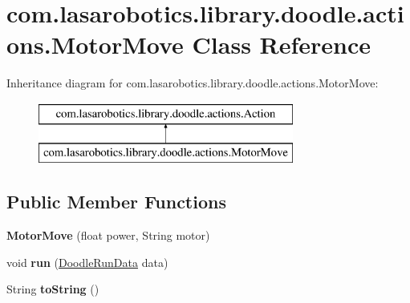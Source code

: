 \hypertarget{classcom_1_1lasarobotics_1_1library_1_1doodle_1_1actions_1_1_motor_move}{}\section{com.\+lasarobotics.\+library.\+doodle.\+actions.\+Motor\+Move Class Reference}
\label{classcom_1_1lasarobotics_1_1library_1_1doodle_1_1actions_1_1_motor_move}
Inheritance diagram for com.\+lasarobotics.\+library.\+doodle.\+actions.\+Motor\+Move\+:\begin{figure}[H]
\begin{center}
\leavevmode
\includegraphics[height=2.000000cm]{classcom_1_1lasarobotics_1_1library_1_1doodle_1_1actions_1_1_motor_move}
\end{center}
\end{figure}
\subsection*{Public Member Functions}
\begin{DoxyCompactItemize}
\item 
\hypertarget{classcom_1_1lasarobotics_1_1library_1_1doodle_1_1actions_1_1_motor_move_aefc719748a420421f891ee0f3e9e97e4}{}{\bfseries Motor\+Move} (float power, String motor)\label{classcom_1_1lasarobotics_1_1library_1_1doodle_1_1actions_1_1_motor_move_aefc719748a420421f891ee0f3e9e97e4}

\item 
\hypertarget{classcom_1_1lasarobotics_1_1library_1_1doodle_1_1actions_1_1_motor_move_a23193548b85fb1628f6a5ea8b1431181}{}void {\bfseries run} (\hyperlink{classcom_1_1lasarobotics_1_1library_1_1doodle_1_1_doodle_run_data}{Doodle\+Run\+Data} data)\label{classcom_1_1lasarobotics_1_1library_1_1doodle_1_1actions_1_1_motor_move_a23193548b85fb1628f6a5ea8b1431181}

\item 
\hypertarget{classcom_1_1lasarobotics_1_1library_1_1doodle_1_1actions_1_1_motor_move_a34d90b5f9de699addd60a63eef16175b}{}String {\bfseries to\+String} ()\label{classcom_1_1lasarobotics_1_1library_1_1doodle_1_1actions_1_1_motor_move_a34d90b5f9de699addd60a63eef16175b}

\end{DoxyCompactItemize}

